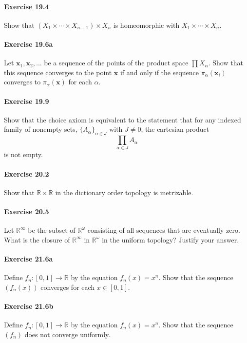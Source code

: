 \documentclass{article}
\begin{document}
\paragraph{Exercise 19.4} Show that $(X_1 \times  \cdots \times X_{n-1}) \times X_n$ is homeomorphic with $X_1 \times  \cdots \times X_n$.

\paragraph{Exercise 19.6a} Let $\mathbf{x}_1, \mathbf{x}_2, \ldots$ be a sequence of the points of the product space $\prod X_\alpha$.  Show that this sequence converges to the point $\mathbf{x}$ if and only if the sequence $\pi_\alpha(\mathbf{x}_i)$ converges to $\pi_\alpha(\mathbf{x})$ for each $\alpha$.

\paragraph{Exercise 19.9} Show that the choice axiom is equivalent to the statement that for any indexed family of nonempty sets, $\{A_\alpha\}_{\alpha \in J}$ with $J \neq 0$, the cartesian product \[\prod_{\alpha \in J} A_\alpha\] is not empty.

\paragraph{Exercise 20.2} Show that $\mathbb{R} \times \mathbb{R}$ in the dictionary order topology is metrizable.

\paragraph{Exercise 20.5} Let $\mathbb{R}^\infty$ be the subset of $\mathbb{R}^\omega$ consisting of all sequences that are eventually zero.  What is the closure of $\mathbb{R}^\infty$ in $\mathbb{R}^\omega$ in the uniform topology? Justify your answer.

\paragraph{Exercise 21.6a} Define $f_{n}:[0,1] \rightarrow \mathbb{R}$ by the equation $f_{n}(x)=x^{n}$. Show that the sequence $\left(f_{n}(x)\right)$ converges for each $x \in[0,1]$.

\paragraph{Exercise 21.6b} Define $f_{n}:[0,1] \rightarrow \mathbb{R}$ by the equation $f_{n}(x)=x^{n}$. Show that the sequence $\left(f_{n}\right)$ does not converge uniformly.
\end{document}
